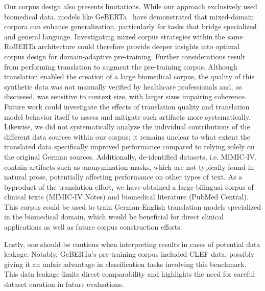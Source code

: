 Our corpus design also presents limitations. While our approach exclusively used
biomedical data, models like GeBERTa~\cite{dada2023impact} have demonstrated
that mixed-domain corpora can enhance generalization, particularly for tasks
that bridge specialized and general language. Investigating mixed corpus
strategies within the same RoBERTa architecture could therefore provide deeper
insights into optimal corpus design for domain-adaptive pre-training. Further
considerations result from performing translation to augment the pre-training
corpus. Although translation enabled the creation of a large biomedical corpus,
the quality of this synthetic data was not manually verified by healthcare
professionals and, as discussed, was sensitive to context size, with larger
sizes impairing coherence. Future work could investigate the effects of
translation quality and translation model behavior itself to assess and mitigate
such artifacts more systematically. Likewise, we did not systematically analyze
the individual contributions of the different data sources within our corpus; it
remains unclear to what extent the translated data specifically improved
performance compared to relying solely on the original German sources.
Additionally, de-identified datasets, i.e. MIMIC-IV, contain artifacts such as
anonymization masks, which are not typically found in natural prose, potentially
affecting performance on other types of text. As a byproduct of the translation
effort, we have obtained a large bilingual corpus of clinical texts (MIMIC-IV
Notes) and biomedical literature (PubMed Central). This corpus could be used to
train German-English translation models specialized in the biomedical domain,
which would be beneficial for direct clinical applications as well as future
corpus construction efforts. 

Lastly, one should be cautious when interpreting results in cases of potential
data leakage. Notably, GeBERTa’s pre-training corpus included CLEF data,
possibly giving it an unfair advantage in classification tasks involving this
benchmark. This data leakage limits direct comparability and highlights the need
for careful dataset curation in future evaluations.
